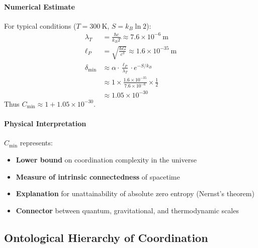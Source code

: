 \documentclass[11pt,a4paper]{article}
\begin{document}
\paragraph{Numerical Estimate}
For typical conditions ($T = 300\ \mathrm{K}$, $S = k_B \ln 2$):
\begin{align}
	\lambda_T &= \frac{\hbar c}{k_B T} \approx 7.6 \times 10^{-6}\ \mathrm{m} \\
	\ell_P &= \sqrt{\frac{\hbar G}{c^3}} \approx 1.6 \times 10^{-35}\ \mathrm{m} \\
	\delta_{\min} &\approx \alpha \cdot \frac{\ell_P}{\lambda_T} \cdot e^{-S/k_B} \\
	&\approx 1 \times \frac{1.6 \times 10^{-35}}{7.6 \times 10^{-6}} \times \frac{1}{2} \\
	&\approx 1.05 \times 10^{-30}
\end{align}
Thus $C_{\min} \approx 1 + 1.05 \times 10^{-30}$.

\paragraph{Physical Interpretation}
$C_{\min}$ represents:
\begin{itemize}
	\item \textbf{Lower bound} on coordination complexity in the universe
	\item \textbf{Measure of intrinsic connectedness} of spacetime
	\item \textbf{Explanation} for unattainability of absolute zero entropy (Nernst's theorem)
	\item \textbf{Connector} between quantum, gravitational, and thermodynamic scales
\end{itemize}

\subsection{Ontological Hierarchy of Coordination}
\end{document}
